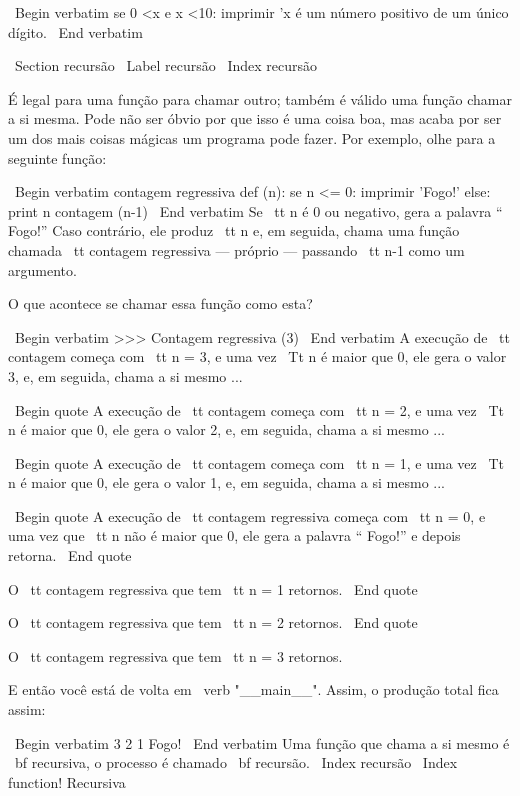 \documentclass[10pt]{book}
\begin{document}
\begin {itemize}
{{\ Begin {verbatim}
se 0 <x e x <10:
    imprimir 'x é um número positivo de um único dígito.
\ End {verbatim}


\ Section {recursão}
\ Label {recursão}
\ Index {recursão}

É legal para uma função para chamar outro;
também é válido uma função chamar a si mesma. Pode não ser óbvio
por que isso é uma coisa boa, mas acaba por ser um dos mais
coisas mágicas um programa pode fazer.
Por exemplo, olhe para a seguinte função:

\ Begin {verbatim}
contagem regressiva def (n):
    se n <= 0:
        imprimir 'Fogo!'
    else:
        print n
        contagem (n-1)
\ End {verbatim}
%
Se {\ tt n} é 0 ou negativo, gera a palavra `` Fogo!''
Caso contrário, ele produz {\ tt n} e, em seguida, chama uma função chamada {\ tt
contagem regressiva} --- próprio --- passando {\ tt n-1} como um argumento.

O que acontece se chamar essa função como esta?

\ Begin {verbatim}
>>> Contagem regressiva (3)
\ End {verbatim}
%
A execução de {\ tt} contagem começa com {\ tt n = 3}, e uma vez
{\ Tt n} é maior que 0, ele gera o valor 3, e, em seguida, chama a si mesmo ...

\ Begin {quote}
A execução de {\ tt} contagem começa com {\ tt n = 2}, e uma vez
{\ Tt n} é maior que 0, ele gera o valor 2, e, em seguida, chama a si mesmo ...

\ Begin {quote}
A execução de {\ tt} contagem começa com {\ tt n = 1}, e uma vez
{\ Tt n} é maior que 0, ele gera o valor 1, e, em seguida, chama a si mesmo ...

\ Begin {quote}
A execução de {\ tt contagem regressiva} começa com {\ tt n = 0}, e uma vez que {\ tt
n} não é maior que 0, ele gera a palavra `` Fogo!'' e depois
retorna.
\ End {quote}

O {\ tt contagem regressiva} que tem {\ tt n = 1} retornos.
\ End {quote}

O {\ tt contagem regressiva} que tem {\ tt n = 2} retornos.
\ End {quote}

O {\ tt contagem regressiva} que tem {\ tt n = 3} retornos.

E então você está de volta em \ verb "__main__". Assim, o
produção total fica assim:

\ Begin {verbatim}
3
2
1
Fogo!
\ End {verbatim}
%
Uma função que chama a si mesmo é {\ bf recursiva}, o processo é
chamado {\ bf recursão}.
\ Index {recursão}
\ Index {function! Recursiva}

}}
\end{itemize}
\end{document}

